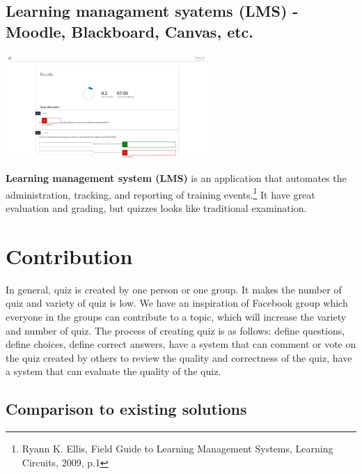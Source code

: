 \documentclass[a4paper, 12pt]{report}
\begin{document}
    \subsection*{Learning managament syatems (LMS) - Moodle, Blackboard, Canvas, etc.}
    \begin{center}
        \includegraphics[height=150px]{LMS.png}
    \end{center}

    \textbf{Learning management system (LMS)} is an application that automates the administration, tracking, and reporting of training events.\footnote{Ryann K. Ellis, Field Guide to Learning Management Systems, Learning Circuits, 2009, p.1} It have great evaluation and grading, but quizzes looks like traditional examination.

    \pagebreak
    \section*{Contribution}

    In general, quiz is created by one person or one group. It makes the number of quiz and variety of quiz is low. We have an inspiration of Facebook group which everyone in the groups can contribute to a topic, which will increase the variety and number of quiz. The process of creating quiz is as follows: define questions, define choices, define correct answers, have a system that can comment or vote on the quiz created by others to review the quality and correctness of the quiz, have a system that can evaluate the quality of the quiz.

    \subsection*{Comparison to existing solutions}
    
\end{document}
